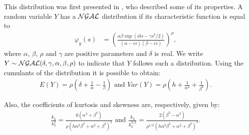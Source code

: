 \documentclass[12pt,a4paper]{article}\usepackage[]{graphicx}\usepackage[]{color}\usepackage{subfigure}
\begin{document}

This distribution was first presented in \cite{reed2006normal}, who described some of its properties. A random variable $Y$ has a $\cal{NGAL}$ distribution if its characteristic function is equal to
\begin{align}\label{rep2}
\varphi_y(s) & = \left(\frac{\alpha\beta \exp(i\delta s-\gamma s^2/2)}{(\alpha-is)(\beta-is)}\right)^\rho,
\end{align}
where $\alpha$, $\beta$, $\rho$ and $\gamma$ are positive parameters and $\delta$ is real. We write $Y\sim{\cal NGAL}(\delta,\gamma,\alpha,\beta,\rho)$ to indicate that $Y$ follows such a distribution.
Using the cumulants of the distribution it is possible to obtain:%
% 
\begin{align*}
E(Y)=\rho\left(\delta+\frac{1}{\alpha}-\frac{1}{\beta}\right) \mbox{ and } Var(Y)=\rho\left(h+\frac{1}{\alpha^2}+\frac{1}{\beta^2}\right).
\end{align*}

Also, the coefficients of kurtosis and skewness are, respectively, given by:
\begin{align*}
\frac{k_4}{k_2^2}=\frac{6(\alpha^4+\beta^4)}{\rho(h\alpha^2\beta^2+\alpha^2+\beta^2)^2} \mbox{ and } \frac{k_3}{k_2^{3/2}}=\frac{2(\beta^3-\alpha^3)}{\rho^{1/2}(h\alpha^2\beta^2+\alpha^2+\beta^2)^2}.
\end{align*}
\end{document}
